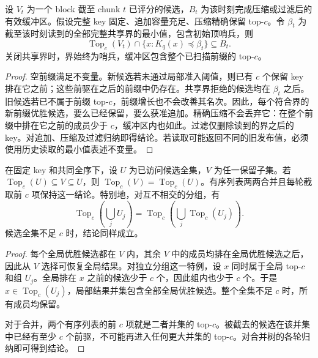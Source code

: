 \begin{resultblock}
\begin{lemma}[局部缓冲区保留]
\label{lem:5-buffer}
设 $V_t$ 为一个 block 截至 chunk $t$ 已评分的候选，$B_t$ 为该时刻完成压缩或过滤后的有效缓冲区。假设完整 key 固定、追加容量充足、压缩精确保留 top-$c$。令 $\beta_t$ 为截至该时刻读到的全部完整共享界的最小值，包含初始顶哨兵，则
\begin{equation}
 \operatorname{Top}_c(V_t)\cap\{x:K_q(x)\preceq\beta_t\}
 \subseteq B_t.
 \label{eq:5-buffer-invariant}
\end{equation}
关闭共享界时，界始终为哨兵，缓冲区包含整个已扫描前缀的 top-$c$。
\end{lemma}
\begin{proof}
空前缀满足不变量。新候选若未通过局部准入阈值，则已有 $c$ 个保留 key 排在它之前；这些前驱在之后的前缀中仍存在。共享界拒绝的候选均在 $\beta_t$ 之后。旧候选若已不属于前缀 top-$c$，前缀增长也不会改善其名次。因此，每个符合界的新前缀优胜候选，要么已经保留，要么获准追加。精确压缩不会丢弃它：在整个前缀中排在它之前的成员少于 $c$，缓冲区内也如此。过滤仅删除读到的界之后的 key。对追加、压缩及过滤归纳即得结论。若读取可能返回不同的旧发布值，必须使用历史读取的最小值表述不变量。
\end{proof}
\end{resultblock}

\begin{resultblock}
\begin{proposition}[覆盖与截断合并]
\label{prop:5-local-coverage}
在固定 key 和共同全序下，设 $U$ 为已访问候选全集，$V$ 为任一保留子集。若 $\operatorname{Top}_c(U)\subseteq V\subseteq U$，则 $\operatorname{Top}_c(V)=\operatorname{Top}_c(U)$。有序列表两两合并且每轮截取前 $c$ 项保持这一结论。特别地，对互不相交的分组，有
\begin{equation}
 \operatorname{Top}_c\!\left(\bigcup_j U_j\right)
 =\operatorname{Top}_c\!\left(\bigcup_j
                    \operatorname{Top}_c(U_j)\right).
 \label{eq:5-topc-union}
\end{equation}
候选全集不足 $c$ 时，结论同样成立。
\end{proposition}
\begin{proof}
每个全局优胜候选都在 $V$ 内，其余 $V$ 中的成员均排在全局优胜候选之后，因此从 $V$ 选择可恢复全局结果。对独立分组这一特例，设 $x$ 同时属于全局 top-$c$ 和组 $U_j$。全局排在 $x$ 之前的候选少于 $c$ 个，因此组内也少于 $c$ 个。于是 $x\in\operatorname{Top}_c(U_j)$，局部结果并集包含全部全局优胜候选。整个全集不足 $c$ 时，所有成员均保留。

对于合并，两个有序列表的前 $c$ 项就是二者并集的 top-$c$。被截去的候选在该并集中已经有至少 $c$ 个前驱，不可能再进入任何更大并集的 top-$c$。对合并树的各轮归纳即可得到结论。
\end{proof}
\end{resultblock}

